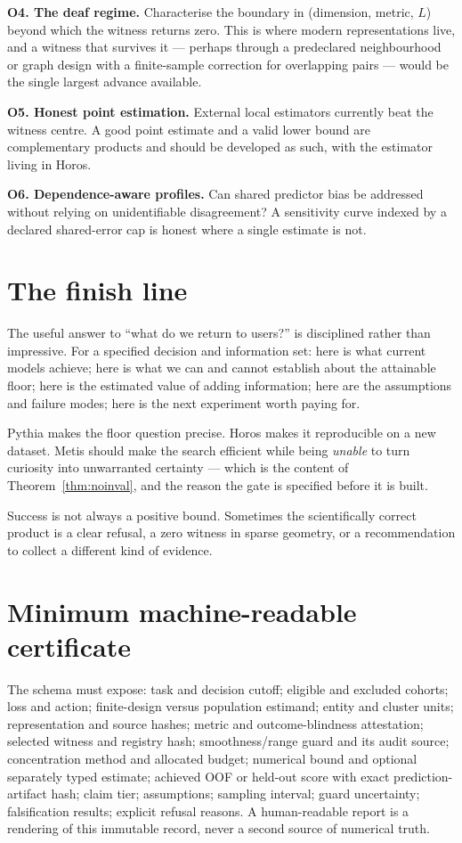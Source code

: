 \documentclass[11pt,a4paper]{article}
\theoremstyle{definition}
\theoremstyle{remark}
\begin{document}
\textbf{O4. The deaf regime.} Characterise the boundary in (dimension, metric, $L$) beyond which the witness returns zero. This is where modern representations live, and a witness that survives it --- perhaps through a predeclared neighbourhood or graph design with a finite-sample correction for overlapping pairs --- would be the single largest advance available.

\textbf{O5. Honest point estimation.} External local estimators currently beat the witness centre. A good point estimate and a valid lower bound are complementary products and should be developed as such, with the estimator living in Horos.

\textbf{O6. Dependence-aware profiles.} Can shared predictor bias be addressed without relying on unidentifiable disagreement? A sensitivity curve indexed by a declared shared-error cap is honest where a single estimate is not.

\section{The finish line}

The useful answer to ``what do we return to users?'' is disciplined rather than impressive. For a specified decision and information set: here is what current models achieve; here is what we can and cannot establish about the attainable floor; here is the estimated value of adding information; here are the assumptions and failure modes; here is the next experiment worth paying for.

Pythia makes the floor question precise. Horos makes it reproducible on a new dataset. Metis should make the search efficient while being \emph{unable} to turn curiosity into unwarranted certainty --- which is the content of Theorem~\ref{thm:noinval}, and the reason the gate is specified before it is built.

Success is not always a positive bound. Sometimes the scientifically correct product is a clear refusal, a zero witness in sparse geometry, or a recommendation to collect a different kind of evidence.

\appendix
\section{Minimum machine-readable certificate}\label{app:cert}

The schema must expose: task and decision cutoff; eligible and excluded cohorts; loss and action; finite-design versus population estimand; entity and cluster units; representation and source hashes; metric and outcome-blindness attestation; selected witness and registry hash; smoothness/range guard and its audit source; concentration method and allocated budget; numerical bound and optional separately typed estimate; achieved OOF or held-out score with exact prediction-artifact hash; claim tier; assumptions; sampling interval; guard uncertainty; falsification results; explicit refusal reasons. A human-readable report is a rendering of this immutable record, never a second source of numerical truth.
\end{document}
